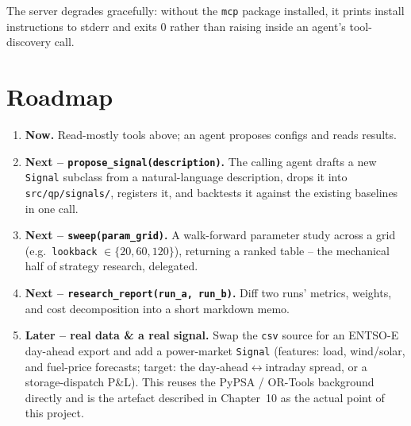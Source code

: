 The server degrades gracefully: without the \texttt{mcp} package installed, it
prints install instructions to stderr and exits 0 rather than raising inside an
agent's tool-discovery call.

\section{Roadmap}

\begin{enumerate}
  \item \textbf{Now.} Read-mostly tools above; an agent proposes configs and
  reads results.
  \item \textbf{Next -- \texttt{propose\_signal(description)}.} The calling agent
  drafts a new \texttt{Signal} subclass from a natural-language description,
  drops it into \texttt{src/qp/signals/}, registers it, and backtests it against
  the existing baselines in one call.
  \item \textbf{Next -- \texttt{sweep(param\_grid)}.} A walk-forward parameter
  study across a grid (e.g.\ \texttt{lookback} $\in \{20, 60, 120\}$), returning
  a ranked table -- the mechanical half of strategy research, delegated.
  \item \textbf{Next -- \texttt{research\_report(run\_a, run\_b)}.} Diff two runs'
  metrics, weights, and cost decomposition into a short markdown memo.
  \item \textbf{Later -- real data \& a real signal.} Swap the \texttt{csv}
  source for an ENTSO-E day-ahead export and add a power-market
  \texttt{Signal} (features: load, wind/solar, and fuel-price forecasts; target:
  the day-ahead$\leftrightarrow$intraday spread, or a storage-dispatch P\&L).
  This reuses the PyPSA / OR-Tools background directly and is the artefact
  described in Chapter~10 as the actual point of this project.
\end{enumerate}

